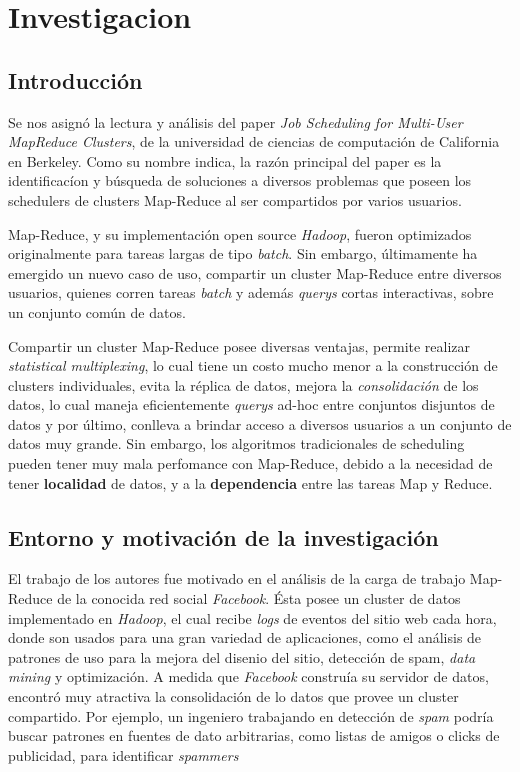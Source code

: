 \section{Investigacion}
\subsection{Introducci\'on}

Se nos asign\'o la lectura y an\'alisis del paper \emph{Job Scheduling for Multi-User MapReduce Clusters}, de la universidad de ciencias de computaci\'on de California en Berkeley. Como su nombre indica, la raz\'on principal del paper es la identificac\'ion y b\'usqueda de soluciones a diversos problemas que poseen los schedulers de clusters Map-Reduce al ser compartidos por varios usuarios.

\vspace{2mm}

Map-Reduce, y su implementaci\'on open source \emph{Hadoop}, fueron optimizados originalmente para tareas largas de tipo \emph{batch}. Sin embargo, \'ultimamente ha emergido un nuevo caso de uso, compartir un cluster Map-Reduce entre diversos usuarios, quienes corren tareas \emph{batch} y adem\'as \emph{querys} cortas interactivas, sobre un conjunto com\'un de datos.

\vspace{2mm}

Compartir un cluster Map-Reduce posee diversas ventajas, permite realizar \emph{statistical multiplexing}, lo cual tiene un costo mucho menor a la construcci\'on de clusters individuales, evita la r\'eplica de datos, mejora la \emph{consolidaci\'on} de los datos, lo cual maneja eficientemente \emph{querys} ad-hoc entre conjuntos disjuntos de datos  y por \'ultimo, conlleva a brindar acceso a diversos usuarios a un conjunto de datos muy grande. Sin embargo, los algoritmos tradicionales de scheduling pueden tener muy mala perfomance con Map-Reduce, debido a la necesidad de tener \textbf{localidad} de datos, y a la \textbf{dependencia} entre las tareas Map y Reduce.

\subsection{Entorno y motivaci\'on de la investigaci\'on}

El trabajo de los autores fue motivado en el an\'alisis de la carga de trabajo Map-Reduce de la conocida red social \emph{Facebook}. \'Esta posee un cluster de datos implementado en \emph{Hadoop}, el cual recibe \emph{logs} de eventos del sitio web cada hora, donde son usados para una gran variedad de aplicaciones, como el an\'alisis de patrones de uso para la mejora del disenio del sitio, detecci\'on de spam, \emph{data mining} y optimizaci\'on. 	A medida que \emph{Facebook} constru\'ia su servidor de datos, encontr\'o muy atractiva la consolidaci\'on de lo datos que provee un cluster compartido. Por ejemplo, un ingeniero trabajando en detecci\'on de \emph{spam} podr\'ia buscar patrones en fuentes de dato arbitrarias, como listas de amigos o clicks de publicidad, para identificar \emph{spammers}

